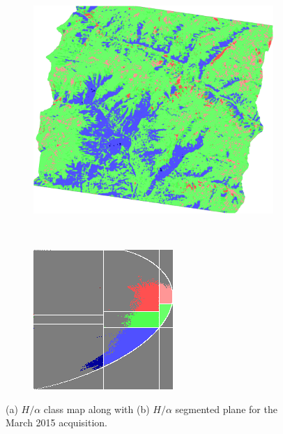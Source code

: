 \begin{figure}
\centering
\begin{subfigure}[t]{0.35\columnwidth}
\includegraphics[width=\columnwidth]{Figures/SnowCover2018/Oldfig/H_alpha_class_mar_2015}
\caption{}
\end{subfigure}
~
\begin{subfigure}[t]{0.3\columnwidth}
\includegraphics[width=\columnwidth]{Figures/SnowCover2018/Oldfig/H_alpha_segmented_plane_mar_2015}
\caption{}
\end{subfigure}
\caption{(a) $H/\alpha$ class map along with (b) $H/\alpha$ segmented plane for the March 2015 acquisition.}
\label{fig:halpha_scat}
\end{figure}



